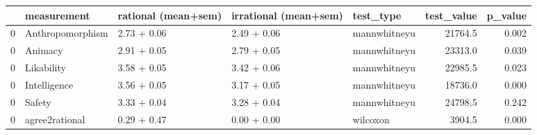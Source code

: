 \begin{tabular}{lllllrr}
\toprule
{} &       measurement & rational (mean+sem) & irrational (mean+sem) &     test\_type &  test\_value &  p\_value \\
\midrule
0 &  Anthropomorphism &         2.73 + 0.06 &           2.49 + 0.06 &  mannwhitneyu &     21764.5 &    0.002 \\
0 &           Animacy &         2.91 + 0.05 &           2.79 + 0.05 &  mannwhitneyu &     23313.0 &    0.039 \\
0 &        Likability &         3.58 + 0.05 &           3.42 + 0.06 &  mannwhitneyu &     22985.5 &    0.023 \\
0 &      Intelligence &         3.56 + 0.05 &           3.17 + 0.05 &  mannwhitneyu &     18736.0 &    0.000 \\
0 &            Safety &         3.33 + 0.04 &           3.28 + 0.04 &  mannwhitneyu &     24798.5 &    0.242 \\
0 &    agree2rational &         0.29 + 0.47 &           0.00 + 0.00 &      wilcoxon &      3904.5 &    0.000 \\
\bottomrule
\end{tabular}
